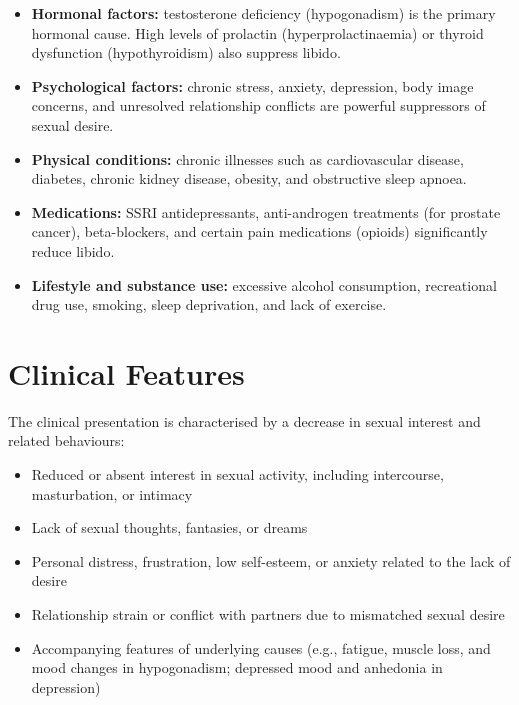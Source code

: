 \begin{itemize}
    \item \textbf{Hormonal factors:} testosterone deficiency (hypogonadism) is the primary hormonal cause. High levels of prolactin (hyperprolactinaemia) or thyroid dysfunction (hypothyroidism) also suppress libido.
    \item \textbf{Psychological factors:} chronic stress, anxiety, depression, body image concerns, and unresolved relationship conflicts are powerful suppressors of sexual desire.
    \item \textbf{Physical conditions:} chronic illnesses such as cardiovascular disease, diabetes, chronic kidney disease, obesity, and obstructive sleep apnoea.
    \item \textbf{Medications:} SSRI antidepressants, anti-androgen treatments (for prostate cancer), beta-blockers, and certain pain medications (opioids) significantly reduce libido.
    \item \textbf{Lifestyle and substance use:} excessive alcohol consumption, recreational drug use, smoking, sleep deprivation, and lack of exercise.
\end{itemize}

\section*{Clinical Features}
The clinical presentation is characterised by a decrease in sexual interest and related behaviours:

\begin{itemize}
    \item Reduced or absent interest in sexual activity, including intercourse, masturbation, or intimacy
    \item Lack of sexual thoughts, fantasies, or dreams
    \item Personal distress, frustration, low self-esteem, or anxiety related to the lack of desire
    \item Relationship strain or conflict with partners due to mismatched sexual desire
    \item Accompanying features of underlying causes (e.g., fatigue, muscle loss, and mood changes in hypogonadism; depressed mood and anhedonia in depression)
\end{itemize}

